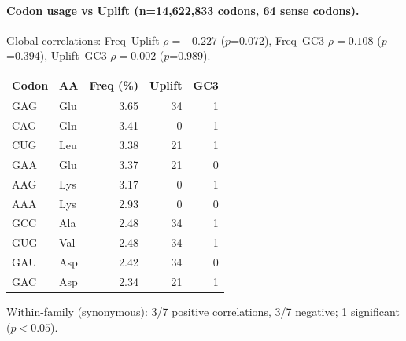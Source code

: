 \paragraph{Codon usage vs Uplift (n=14,622,833 codons, 64 sense codons).}
Global correlations: Freq--Uplift $\rho=-0.227$ ($p$=0.072), Freq--GC3 $\rho=0.108$ ($p$=0.394), Uplift--GC3 $\rho=0.002$ ($p$=0.989).
\begin{center}\small
\begin{tabular}{llrrr}\toprule
Codon & AA & Freq (\%) & Uplift & GC3 \\\midrule
GAG & Glu & 3.65 & 34 & 1 \\
CAG & Gln & 3.41 & 0 & 1 \\
CUG & Leu & 3.38 & 21 & 1 \\
GAA & Glu & 3.37 & 21 & 0 \\
AAG & Lys & 3.17 & 0 & 1 \\
AAA & Lys & 2.93 & 0 & 0 \\
GCC & Ala & 2.48 & 34 & 1 \\
GUG & Val & 2.48 & 34 & 1 \\
GAU & Asp & 2.42 & 34 & 0 \\
GAC & Asp & 2.34 & 21 & 1 \\
\bottomrule\end{tabular}\end{center}
Within-family (synonymous): 3/7 positive correlations, 3/7 negative; 1 significant ($p<0.05$).
